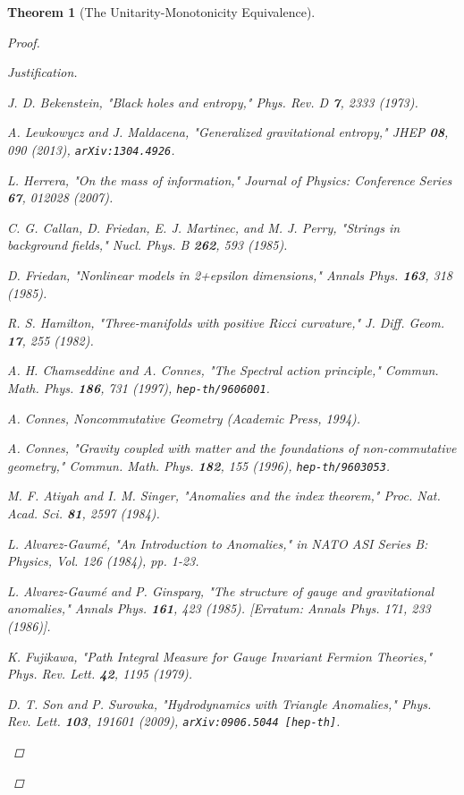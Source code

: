 \documentclass[11pt, letterpaper]{report}
\theoremstyle{plain} %
\newtheorem{theorem}{Theorem}[chapter]
\theoremstyle{definition} %
\theoremstyle{remark} %
\begin{document}
\begin{theorem}[The Unitarity-Monotonicity Equivalence]
\begin{proof}
\begin{proof}[Justification]
\begin{thebibliography}{99}
J. D. Bekenstein, "Black holes and entropy," \textit{Phys. Rev. D} \textbf{7}, 2333 (1973).

A. Lewkowycz and J. Maldacena, "Generalized gravitational entropy," \textit{JHEP} \textbf{08}, 090 (2013), \texttt{arXiv:1304.4926}.

L. Herrera, "On the mass of information," \textit{Journal of Physics: Conference Series} \textbf{67}, 012028 (2007).

C. G. Callan, D. Friedan, E. J. Martinec, and M. J. Perry, "Strings in background fields," \textit{Nucl. Phys. B} \textbf{262}, 593 (1985).

D. Friedan, "Nonlinear models in 2+epsilon dimensions," \textit{Annals Phys.} \textbf{163}, 318 (1985).

R. S. Hamilton, "Three-manifolds with positive Ricci curvature," \textit{J. Diff. Geom.} \textbf{17}, 255 (1982).

A. H. Chamseddine and A. Connes, "The Spectral action principle," \textit{Commun. Math. Phys.} \textbf{186}, 731 (1997), \texttt{hep-th/9606001}.

A. Connes, \textit{Noncommutative Geometry} (Academic Press, 1994).

A. Connes, "Gravity coupled with matter and the foundations of non-commutative geometry," \textit{Commun. Math. Phys.} \textbf{182}, 155 (1996), \texttt{hep-th/9603053}.

M. F. Atiyah and I. M. Singer, "Anomalies and the index theorem," \textit{Proc. Nat. Acad. Sci.} \textbf{81}, 2597 (1984).

L. Alvarez-Gaumé, "An Introduction to Anomalies," in \textit{NATO ASI Series B: Physics, Vol. 126} (1984), pp. 1-23.

L. Alvarez-Gaumé and P. Ginsparg, "The structure of gauge and gravitational anomalies," \textit{Annals Phys.} \textbf{161}, 423 (1985). [Erratum: Annals Phys. 171, 233 (1986)].

K. Fujikawa, "Path Integral Measure for Gauge Invariant Fermion Theories," \textit{Phys. Rev. Lett.} \textbf{42}, 1195 (1979).

D. T. Son and P. Surowka, "Hydrodynamics with Triangle Anomalies," \textit{Phys. Rev. Lett.} \textbf{103}, 191601 (2009), \texttt{arXiv:0906.5044 [hep-th]}.


\end{thebibliography}
\end{proof}
\end{proof}
\end{theorem}
\end{document}

